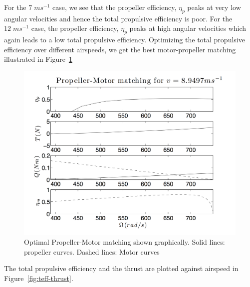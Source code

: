 \documentclass[11pt]{article}
\begin{document}
For the $7 \; ms^{-1}$ case, we see that the propeller efficiency, $\eta_p$ peaks at very low angular velocities and hence the total propulsive efficiency is poor. For the $12 \; ms^{-1}$ case, the propeller efficiency, $\eta_p$ peaks at high angular velocities which again leads to a low total propulsive efficiency. Optimizing the total propulsive efficiency over different airspeeds, we get the best motor-propeller matching illustrated in Figure~\ref{fig:prop-motor2}

\begin{figure}[h!]
  \centering
  \includegraphics[width=\textwidth]{Figures/PS3/propmotor_opt.png}
  \caption{Optimal Propeller-Motor matching shown graphically. Solid lines: propeller curves. Dashed lines: Motor curves}\label{fig:prop-motor2}
\end{figure}

The total propulsive efficiency and the thrust are plotted against airspeed in Figure~\ref{fig:teff-thrust}.
\end{document}

